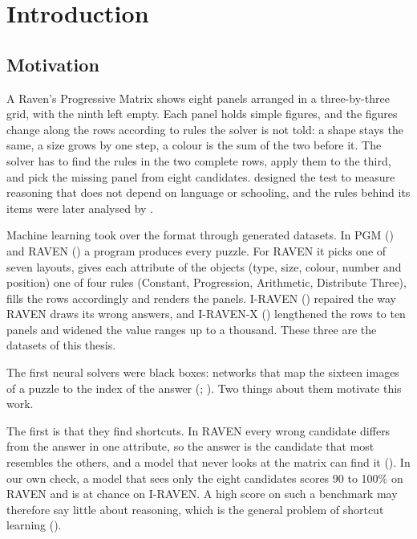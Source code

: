 \chapter{Introduction}\label{ch:1}

\section{Motivation}\label{sec:1.1}

A Raven's Progressive Matrix shows eight panels arranged in a three-by-three grid, with the ninth left empty. Each panel holds simple figures, and the figures change along the rows according to rules the solver is not told: a shape stays the same, a size grows by one step, a colour is the sum of the two before it. The solver has to find the rules in the two complete rows, apply them to the third, and pick the missing panel from eight candidates. \citet{raven1938progressive} designed the test to measure reasoning that does not depend on language or schooling, and the rules behind its items were later analysed by \citet{carpenter1990what}.

Machine learning took over the format through generated datasets. In PGM (\citealp{barrett2018measuring}) and RAVEN (\citealp{zhang2019raven}) a program produces every puzzle. For RAVEN it picks one of seven layouts, gives each attribute of the objects (type, size, colour, number and position) one of four rules (Constant, Progression, Arithmetic, Distribute Three), fills the rows accordingly and renders the panels. I-RAVEN (\citealp{hu2021stratified}) repaired the way RAVEN draws its wrong answers, and I-RAVEN-X (\citealp{hersche2024towards}) lengthened the rows to ten panels and widened the value ranges up to a thousand. These three are the datasets of this thesis.

The first neural solvers were black boxes: networks that map the sixteen images of a puzzle to the index of the answer (\citealp{barrett2018measuring}; \citealp{zhuo2020solving}). Two things about them motivate this work.

The first is that they find shortcuts. In RAVEN every wrong candidate differs from the answer in one attribute, so the answer is the candidate that most resembles the others, and a model that never looks at the matrix can find it (\citealp{hu2021stratified}). In our own check, a model that sees only the eight candidates scores 90 to 100\% on RAVEN and is at chance on I-RAVEN. A high score on such a benchmark may therefore say little about reasoning, which is the general problem of shortcut learning (\citealp{geirhos2020shortcut}).

